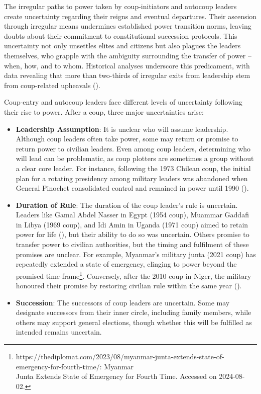 \documentclass[
  12pt,
]{report}
\begin{document}
The irregular paths to power taken by coup-initiators and autocoup
leaders create uncertainty regarding their reigns and eventual
departures. Their ascension through irregular means undermines
established power transition norms, leaving doubts about their
commitment to constitutional succession protocols. This uncertainty not
only unsettles elites and citizens but also plagues the leaders
themselves, who grapple with the ambiguity surrounding the transfer of
power -- when, how, and to whom. Historical analyses underscore this
predicament, with data revealing that more than two-thirds of irregular
exits from leadership stem from coup-related upheavals
().

Coup-entry and autocoup leaders face different levels of uncertainty
following their rise to power. After a coup, three major uncertainties
arise:

\begin{itemize}
\item
  \textbf{Leadership Assumption}: It is unclear who will assume
  leadership. Although coup leaders often take power, some may return or
  promise to return power to civilian leaders. Even among coup leaders,
  determining who will lead can be problematic, as coup plotters are
  sometimes a group without a clear core leader. For instance, following
  the 1973 Chilean coup, the initial plan for a rotating presidency
  among military leaders was abandoned when General Pinochet
  consolidated control and remained in power until 1990
  ().
\item
  \textbf{Duration of Rule}: The duration of the coup leader's rule is
  uncertain. Leaders like Gamal Abdel Nasser in Egypt (1954 coup),
  Muammar Gaddafi in Libya (1969 coup), and Idi Amin in Uganda (1971
  coup) aimed to retain power for life
  (), but
  their ability to do so was uncertain. Others promise to transfer power
  to civilian authorities, but the timing and fulfilment of these
  promises are unclear. For example, Myanmar's military junta (2021
  coup) has repeatedly extended a state of emergency, clinging to power
  beyond the promised time-frame\footnote{https://thediplomat.com/2023/08/myanmar-junta-extends-state-of-emergency-for-fourth-time/:
    Myanmar\\
    Junta Extends State of Emergency for Fourth Time. Accessed on
    2024-08-02.}. Conversely, after the 2010 coup in Niger, the military
  honoured their promise by restoring civilian rule within the same year
  ().
\item
  \textbf{Succession}: The successors of coup leaders are uncertain.
  Some may designate successors from their inner circle, including
  family members, while others may support general elections, though
  whether this will be fulfilled as intended remains uncertain.
\end{itemize}
\end{document}
